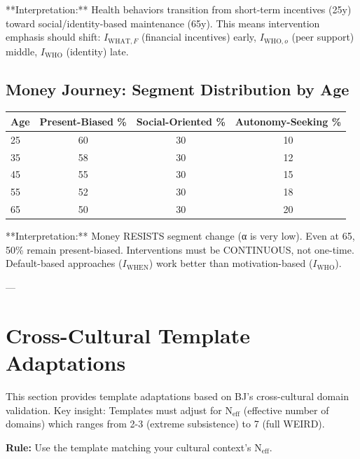 **Interpretation:** Health behaviors transition from short-term incentives (25y) toward social/identity-based maintenance (65y). This means intervention emphasis should shift: $I_{\text{WHAT},F}$ (financial incentives) early, $I_{\text{WHO},o}$ (peer support) middle, $I_{\text{WHO}}$ (identity) late.

\subsection{Money Journey: Segment Distribution by Age}

\begin{center}
\begin{tabular}{@{}lccc@{}}
\toprule
\textbf{Age} & \textbf{Present-Biased \%} & \textbf{Social-Oriented \%} & \textbf{Autonomy-Seeking \%} \\
\midrule
25 & 60 & 30 & 10 \\
35 & 58 & 30 & 12 \\
45 & 55 & 30 & 15 \\
55 & 52 & 30 & 18 \\
65 & 50 & 30 & 20 \\
\midrule
\end{tabular}
\end{center}

**Interpretation:** Money RESISTS segment change (α is very low). Even at 65, 50\% remain present-biased. Interventions must be CONTINUOUS, not one-time. Default-based approaches ($I_{\text{WHEN}}$) work better than motivation-based ($I_{\text{WHO}}$).

---


\section{Cross-Cultural Template Adaptations}
\label{rrr:crosscultural}

\begin{tcolorbox}[colback=orange!5!white, colframe=orange!75!black, title=Connection to Appendix BJ]
This section provides template adaptations based on BJ's cross-cultural domain validation.
Key insight: Templates must adjust for N$_{\text{eff}}$ (effective number of domains) which
ranges from 2-3 (extreme subsistence) to 7 (full WEIRD).

\textbf{Rule:} Use the template matching your cultural context's N$_{\text{eff}}$.
\end{tcolorbox}

